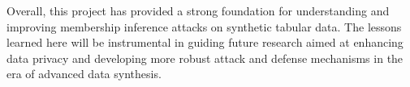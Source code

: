 \documentclass[12pt]{article}
\begin{document}
Overall, this project has provided a strong foundation for understanding and improving membership inference attacks on synthetic tabular data. The lessons learned here will be instrumental in guiding future research aimed at enhancing data privacy and developing more robust attack and defense mechanisms in the era of advanced data synthesis.
\end{document}
